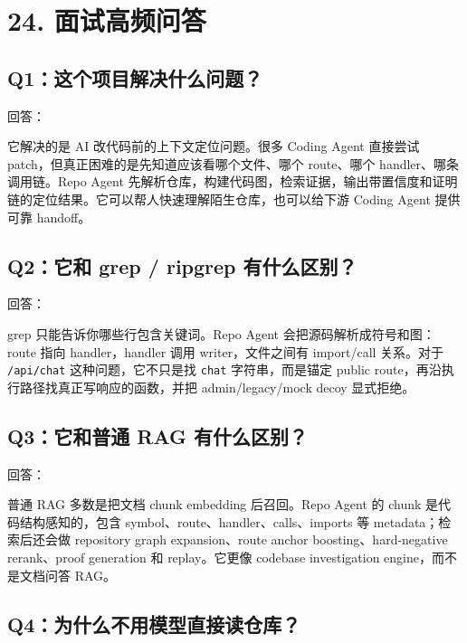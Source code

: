 \documentclass[UTF8,12pt,openany]{ctexbook}
\begin{document}
\section{24. 面试高频问答}

\subsection{Q1：这个项目解决什么问题？}

回答：\par

它解决的是 AI 改代码前的上下文定位问题。很多 Coding Agent 直接尝试 patch，但真正困难的是先知道应该看哪个文件、哪个 route、哪个 handler、哪条调用链。Repo Agent 先解析仓库，构建代码图，检索证据，输出带置信度和证明链的定位结果。它可以帮人快速理解陌生仓库，也可以给下游 Coding Agent 提供可靠 handoff。\par

\subsection{Q2：它和 grep / ripgrep 有什么区别？}

回答：\par

grep 只能告诉你哪些行包含关键词。Repo Agent 会把源码解析成符号和图：route 指向 handler，handler 调用 writer，文件之间有 import/call 关系。对于 \texttt{/api/chat} 这种问题，它不只是找 \texttt{chat} 字符串，而是锚定 public route，再沿执行路径找真正写响应的函数，并把 admin/legacy/mock decoy 显式拒绝。\par

\subsection{Q3：它和普通 RAG 有什么区别？}

回答：\par

普通 RAG 多数是把文档 chunk embedding 后召回。Repo Agent 的 chunk 是代码结构感知的，包含 symbol、route、handler、calls、imports 等 metadata；检索后还会做 repository graph expansion、route anchor boosting、hard-negative rerank、proof generation 和 replay。它更像 codebase investigation engine，而不是文档问答 RAG。\par

\subsection{Q4：为什么不用模型直接读仓库？}
\end{document}
